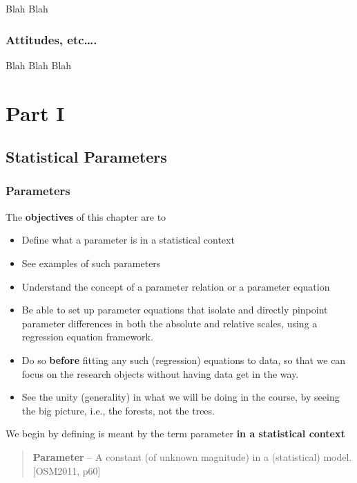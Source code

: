 \documentclass[]{book}
\begin{document}
Blah Blah

\hypertarget{attitudes-etc.-1}{%
\section{Attitudes, etc\ldots{}.}\label{attitudes-etc.-1}}

Blah Blah Blah

\hypertarget{part-part-i-1}{%
\part{Part I}\label{part-part-i-1}}

\hypertarget{paras}{%
\chapter{Statistical Parameters}\label{paras}}

\hypertarget{parameters-1}{%
\section{Parameters}\label{parameters-1}}

The \textbf{objectives} of this chapter are to

\begin{itemize}
\item
  Define what a parameter is in a statistical context
\item
  See examples of such parameters
\item
  Understand the concept of a parameter relation or a parameter equation
\item
  Be able to set up parameter equations that isolate and directly pinpoint parameter differences in both the absolute and relative scales, using a regression equation framework.
\item
  Do so \textbf{before} fitting any such (regression) equations to data, so that we can focus on the research objects without having data get in the way.
\item
  See the unity (generality) in what we will be doing in the course, by seeing the big picture, i.e., the forests, not the trees.
\end{itemize}

We begin by defining is meant by the term parameter \textbf{in a statistical context}

\begin{quote}
\textbf{Parameter} -- A constant (of unknown magnitude) in a (statistical) model. {[}OSM2011, p60{]}
\end{quote}
\end{document}
